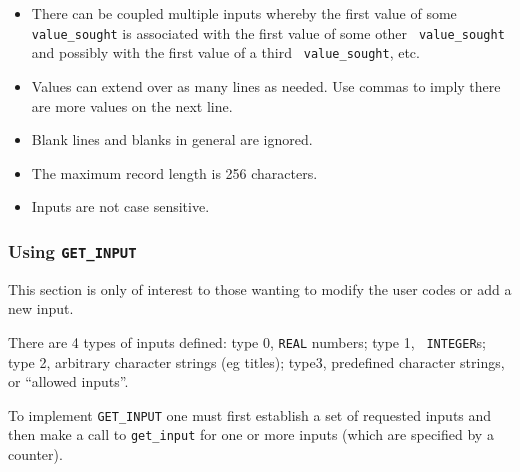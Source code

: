 \documentclass[12pt,twoside]{article}  %
\begin{document}
\begin{itemize}
\item There can be coupled multiple inputs whereby the first value of some
{\tt value\_sought} is associated with the first value of some other {\tt
value\_sought} and possibly with the first value of a third {\tt
value\_sought}, etc.

\item Values can extend over as many lines as needed. Use commas to imply
there are more values on the next line.

\item Blank lines and blanks in general are ignored.

\item The maximum record length is 256 characters.

\item Inputs are not case sensitive.

\end{itemize} 

\subsubsection{Using {\tt GET\_INPUT}}

This section is only of interest to those wanting to modify the user codes
or add a new input.

There are 4 types of inputs defined: type 0, {\tt REAL} numbers; type 1, {\tt
INTEGER}s; type 2,  arbitrary character strings (eg
titles); type3, predefined
character strings, or ``allowed inputs''.

To implement \verb+GET_INPUT+ one must first establish a set of requested
inputs and then make a call to {\tt get\_input} for one or more inputs
(which are specified by a counter).
\end{document}
